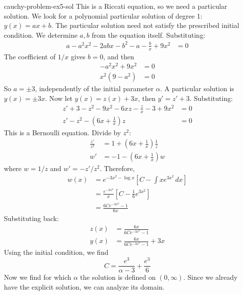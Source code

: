 \documentclass[preview]{standalone}
\begin{document}
\begin{snippetsolution}{cauchy-problem-ex5-sol}{}
    This is a Riccati equation, so we need a particular solution.
    We look for a polynomial particular solution of degree 1: \(y(x) = ax + b\).
    The particular solution need not satisfy the prescribed initial condition.
    We determine \(a,b\) from the equation itself.
    Substituting:
    \begin{align*}
        a - a^2x^2 - 2abx - b^2 - a - \frac{b}{x} + 9x^2 &= 0
    \end{align*}
    The coefficient of \(1/x\) gives \(b=0\), and then
    \begin{align*}
        -a^2 x^2 + 9x^2 &= 0 \\
        x^2(9 - a^2) &= 0
    \end{align*}
    So \(a=\pm3\), independently of the initial parameter \(\alpha\).
    A particular solution is \(y(x) = \pm 3x\).
    Now let \(y(x) = z(x) + 3x\), then \(y' = z' + 3\).
    Substituting:
    \begin{align*}
        z' + 3 - z^2 - 9x^2 - 6xz - \frac{z}{x} - 3 + 9x^2 &= 0 \\
        z' - z^2 - \left(6x + \frac{1}{x}\right)z &= 0
    \end{align*}
    This is a Bernoulli equation. Divide by \(z^2\):
    \begin{align*}
        \frac{z'}{z^2} &= 1 + \left(6x + \frac{1}{x}\right) \frac{1}{z} \\
        w' &= -1 - \left(6x + \frac{1}{x}\right) w
    \end{align*}
    where \(w = 1/z\) and \(w' = -z'/z^2\).
    Therefore,
    \begin{align*}
        w(x) &= e^{-3x^2 - \log x} \left[
            C - \int xe^{3x^2}\,dx
        \right] \\
        &= \frac{e^{-3x^2}}{x}\left[
            C - \frac{1}{6}e^{3x^2}
        \right] \\
        &= \frac{6Ce^{-3x^2} - 1}{6x}
    \end{align*}
    Substituting back:
    \begin{align*}
        z(x) &= \frac{6x}{6Ce^{-3x^2} - 1} \\
        y(x) &= \frac{6x}{6Ce^{-3x^2}-1} + 3x
    \end{align*}
    Using the initial condition, we find
    \[
        C = \frac{e^3}{\alpha - 3} + \frac{e^3}{6}
    \]
    Now we find for which \(\alpha\) the solution is defined on \((0, \infty)\).
    Since we already have the explicit solution, we can analyze its domain.

\end{snippetsolution}
\end{document}
